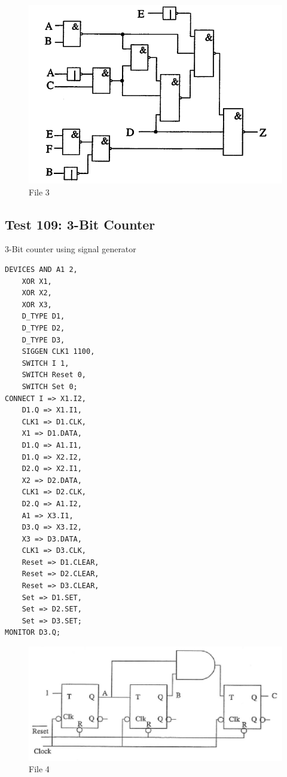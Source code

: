 \documentclass[12pt]{article}
\begin{document}
\begin{figure}[H]
	\centering
	\includegraphics[width=0.9\linewidth]{figures/Test104.png}
	\captionsetup{width=.7\linewidth}
	\caption{File 3}
	\label{fig:5}
\end{figure}


\subsection{Test 109: 3-Bit Counter}
3-Bit counter using signal generator\\
\begin{verbatim}
DEVICES	AND A1 2,
	XOR X1,
	XOR X2,
	XOR X3,
	D_TYPE D1,
	D_TYPE D2,
	D_TYPE D3,
	SIGGEN CLK1 1100,
	SWITCH I 1,
	SWITCH Reset 0,
	SWITCH Set 0;
CONNECT	I => X1.I2,
	D1.Q => X1.I1,
	CLK1 => D1.CLK,
	X1 => D1.DATA,
	D1.Q => A1.I1,
	D1.Q => X2.I2,
	D2.Q => X2.I1,
	X2 => D2.DATA,
	CLK1 => D2.CLK,
	D2.Q => A1.I2,
	A1 => X3.I1,
	D3.Q => X3.I2,
	X3 => D3.DATA,
	CLK1 => D3.CLK,
	Reset => D1.CLEAR,
	Reset => D2.CLEAR,
	Reset => D3.CLEAR,
	Set => D1.SET,
	Set => D2.SET,
	Set => D3.SET;
MONITOR	D3.Q;

\end{verbatim}
\begin{figure}[H]
	\centering
	\includegraphics[width=0.9\linewidth]{figures/test107.png}
	\captionsetup{width=.7\linewidth}
	\caption{File 4}
	\label{fig:6}
\end{figure}
\end{document}
